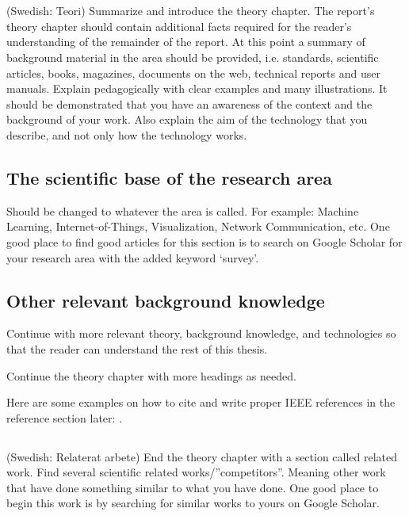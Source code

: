 \section{}\label{sec:theory} 
(Swedish: Teori) Summarize and introduce the theory chapter. The report’s theory chapter should contain additional facts required for the reader's understanding of the remainder of the report. At this point a summary of background material in the area should be provided, i.e. standards, scientific articles, books, magazines, documents on the web, technical reports and user manuals. Explain pedagogically with clear examples and many illustrations. It should be demonstrated that you have an awareness of the context and the background of your work. Also explain the aim of the technology that you describe, and not only how the technology works.

\subsection{The scientific base of the research area}
Should be changed to whatever the area is called. For example: Machine Learning, Internet-of-Things, Visualization, Network Communication, etc. One good place to find good articles for this section is to search on Google Scholar for your research area with the added keyword ‘survey’.

\subsection{Other relevant background knowledge}
Continue with more relevant theory, background knowledge, and technologies so that the reader can understand the rest of this thesis.

Continue the theory chapter with more headings as needed.

Here are some examples on how to cite and write proper IEEE references in the reference section later: \cite{attapangittya2003social, smith2004adaptive, hayes2007operations, wilson2023computers, kawasaki1993parametric}.

\subsection{}
(Swedish: Relaterat arbete) End the theory chapter with a section called related work. Find several scientific related works/”competitors”. Meaning other work that have done something similar to what you have done. One good place to begin this work is by searching for similar works to yours on Google Scholar.

